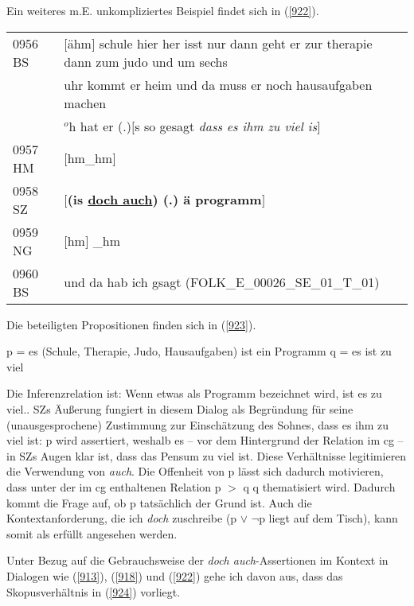 {Ein weiteres m.E. unkompliziertes Beispiel findet sich in (\ref{922}).

\begin{exe}
	\ex\label{922} 
	\scriptsize
    \begin{tabular}[t]{ll}
	0956 BS	& $[$ähm$]$ schule hier her isst nur dann geht er zur therapie dann zum judo und um sechs\\
	{} & uhr kommt er heim und da muss er noch hausaufgaben machen\\
	{} & $^{o}$h hat er (.)$[$s so gesagt \emph{dass es ihm zu viel is}$]$\\
	0957 HM & $[$hm\_hm$]$\\
	0958 SZ & \hspace{1cm} \textbf{$[$(is \underline{doch auch}) (.) ä programm$]$}\\
	0959 NG & $[$hm$]$ \_hm\\
	0960 BS & und da hab ich gsagt	
	\hfill\hbox{(FOLK\_E\_00026\_SE\_01\_T\_01)} 					 
    \end{tabular}   
\end{exe}
Die beteiligten Propositionen finden sich in (\ref{923}).

\begin{exe}
	\ex\label{923} 
		\begin{xlist}	
			\ex\label{923a} p = es (Schule, Therapie, Judo, Hausaufgaben) ist ein Programm
			\ex\label{923b} q = es ist zu viel
		\end{xlist}
\end{exe}
Die Inferenzrelation  ist: \glq Wenn etwas als Programm bezeichnet wird, ist es zu viel.\grq {}. SZs Äußerung fungiert in diesem Dialog als Begründung für seine (unausgesprochene) Zustimmung zur Einschätzung des Sohnes, dass es ihm zu viel ist: p wird assertiert, weshalb es – vor dem Hintergrund der Relation im cg – in SZs Augen klar ist, dass das Pensum zu viel ist. Diese Verhältnisse legitimieren die Verwendung von \textit{auch}. Die Offenheit von p  lässt sich dadurch motivieren, dass unter der im cg enthaltenen Relation p $>$ q q thematisiert wird. Dadurch kommt die Frage auf, ob p tatsächlich der Grund ist. Auch die Kontextanforderung, die ich \textit{doch} zuschreibe (p $\vee$ $\neg$p liegt auf dem Tisch), kann somit als erfüllt angesehen werden.

Unter Bezug auf die Gebrauchsweise der \textit{doch auch}-Assertionen im Kontext in Dialogen wie (\ref{913}), (\ref{918}) und (\ref{922}) gehe ich davon aus, dass das Skopusverhältnis in (\ref{924}) vorliegt.

}
